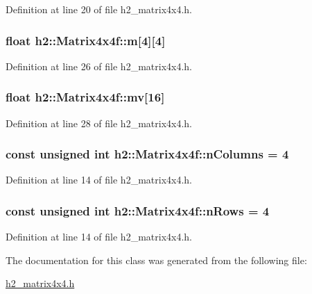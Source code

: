 Definition at line 20 of file h2\-\_\-matrix4x4.\-h.

\hypertarget{classh2_1_1_matrix4x4f_af323c8a5b194faa2b5e443cdf6d56721}{
\subsubsection[{m}]{\setlength{\rightskip}{0pt plus 5cm}float h2\-::\-Matrix4x4f\-::m\mbox{[}4\mbox{]}\mbox{[}4\mbox{]}}}\label{classh2_1_1_matrix4x4f_af323c8a5b194faa2b5e443cdf6d56721}


Definition at line 26 of file h2\-\_\-matrix4x4.\-h.

\hypertarget{classh2_1_1_matrix4x4f_a4feb2ce3acca58b0e4f7210466d602fe}{
\subsubsection[{mv}]{\setlength{\rightskip}{0pt plus 5cm}float h2\-::\-Matrix4x4f\-::mv\mbox{[}16\mbox{]}}}\label{classh2_1_1_matrix4x4f_a4feb2ce3acca58b0e4f7210466d602fe}


Definition at line 28 of file h2\-\_\-matrix4x4.\-h.

\hypertarget{classh2_1_1_matrix4x4f_afe40a59289c44ea2ab5af687a6273cd5}{
\subsubsection[{n\-Columns}]{\setlength{\rightskip}{0pt plus 5cm}const unsigned int h2\-::\-Matrix4x4f\-::n\-Columns = 4\hspace{0.3cm}{\ttfamily [static]}}}\label{classh2_1_1_matrix4x4f_afe40a59289c44ea2ab5af687a6273cd5}


Definition at line 14 of file h2\-\_\-matrix4x4.\-h.

\hypertarget{classh2_1_1_matrix4x4f_a8f34e740d516c663667e2e0392411415}{
\subsubsection[{n\-Rows}]{\setlength{\rightskip}{0pt plus 5cm}const unsigned int h2\-::\-Matrix4x4f\-::n\-Rows = 4\hspace{0.3cm}{\ttfamily [static]}}}\label{classh2_1_1_matrix4x4f_a8f34e740d516c663667e2e0392411415}


Definition at line 14 of file h2\-\_\-matrix4x4.\-h.



The documentation for this class was generated from the following file\-:\begin{DoxyCompactItemize}
\item 
\hyperlink{h2__matrix4x4_8h}{h2\-\_\-matrix4x4.\-h}\end{DoxyCompactItemize}
